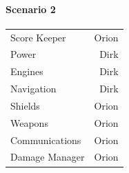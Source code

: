 \documentclass[10pt]{article}
\begin{document}
\paragraph*{Scenario 2}
\begin{tabular}{l r}
   Score Keeper & Orion \\
   Power & Dirk \\
   Engines & Dirk \\
   Navigation & Dirk \\
   Shields & Orion \\
   Weapons & Orion \\
   Communications & Orion \\
   Damage Manager & Orion \\
\end{tabular}
\end{document}
